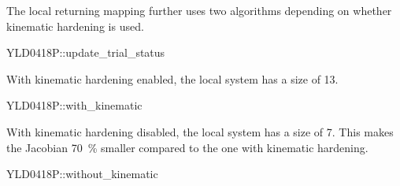 The local returning mapping further uses two algorithms depending on whether kinematic hardening is used.
\begin{cppcode}
YLD0418P::update_trial_status
\end{cppcode}

With kinematic hardening enabled, the local system has a size of \num{13}.
\begin{cppcode}
YLD0418P::with_kinematic
\end{cppcode}

With kinematic hardening disabled, the local system has a size of \num{7}.
This makes the Jacobian \SI{70}{\percent} smaller compared to the one with kinematic hardening.
\begin{cppcode}
YLD0418P::without_kinematic
\end{cppcode}

